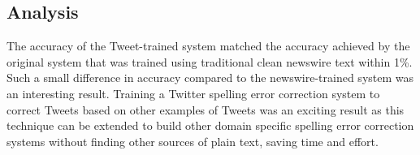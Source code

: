 \subsection{Analysis}
\label{tweetanalysis}
The accuracy of the Tweet-trained system matched the accuracy achieved by the original system that was trained using traditional clean newswire text within 1\%. Such a small difference in accuracy compared to the newswire-trained system was an interesting result. Training a Twitter spelling error correction system to correct Tweets based on other examples of Tweets was an exciting result as this technique can be extended to build other domain specific spelling error correction systems without finding other sources of plain text, saving time and effort.

